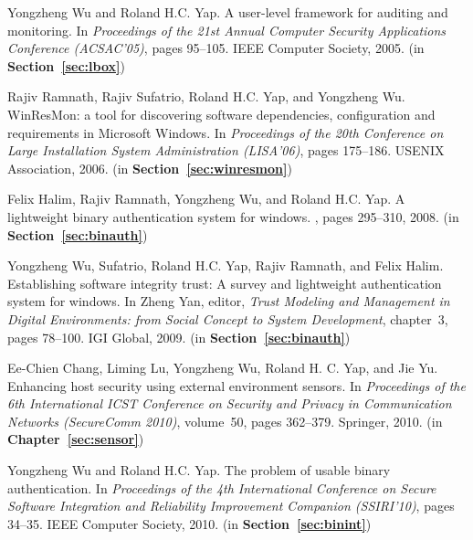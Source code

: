 \begin{tightenumerate}
\item
Yongzheng Wu and Roland H.C. Yap.
\newblock A user-level framework for auditing and monitoring.
\newblock In {\em Proceedings of the 21st Annual Computer Security Applications
  Conference (ACSAC'05)}, pages 95--105. IEEE Computer Society, 2005.
\newblock (in {\bf Section~\ref{sec:lbox}})

\item
Rajiv Ramnath, Rajiv Sufatrio, Roland H.C. Yap, and Yongzheng Wu.
\newblock WinResMon: a tool for discovering software dependencies,
  configuration and requirements in Microsoft Windows.
\newblock In {\em Proceedings of the 20th Conference on Large Installation
  System Administration (LISA'06)}, pages 175--186. USENIX Association, 2006.
\newblock (in {\bf Section~\ref{sec:winresmon}})

\item
Felix Halim, Rajiv Ramnath, Yongzheng Wu, and Roland H.C. Yap.
\newblock A lightweight binary authentication system for windows.
, pages 295--310, 2008.
\newblock (in {\bf Section~\ref{sec:binauth}})

\item
Yongzheng Wu, Sufatrio, Roland H.C. Yap, Rajiv Ramnath, and Felix Halim.
\newblock Establishing software integrity trust: A survey and lightweight
  authentication system for windows.
\newblock In Zheng Yan, editor, {\em Trust Modeling and Management in Digital
  Environments: from Social Concept to System Development}, chapter~3,
  pages 78--100. IGI Global, 2009.
\newblock (in {\bf Section~\ref{sec:binauth}})

\item
Ee-Chien Chang, Liming Lu, Yongzheng Wu, Roland H. C. Yap, and Jie Yu.
\newblock Enhancing host security using external environment sensors.
\newblock In {\em Proceedings of the 6th International ICST Conference on
  Security and Privacy in Communication Networks (SecureComm 2010)}, volume~50,
  pages 362--379. Springer, 2010.
\newblock (in {\bf Chapter~\ref{sec:sensor}})

\item
Yongzheng Wu and Roland H.C. Yap.
\newblock The problem of usable binary authentication.
\newblock In {\em Proceedings of the 4th International Conference on Secure
  Software Integration and Reliability Improvement Companion (SSIRI'10)}, pages 34--35.
  IEEE Computer Society, 2010.
\newblock (in {\bf Section~\ref{sec:binint}})


\end{tightenumerate}
